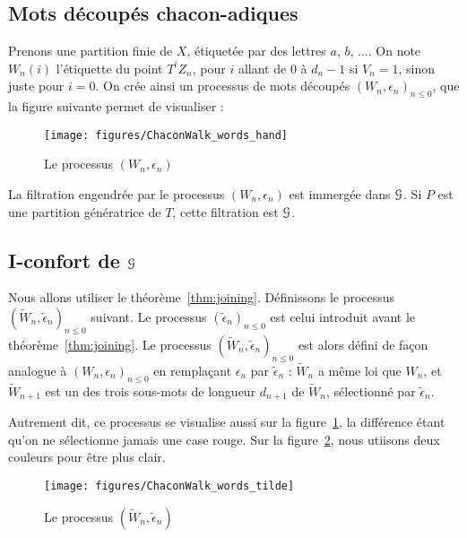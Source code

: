 \documentclass[12pt,a4paper]{article}
\begin{document}
\subsection{Mots découpés chacon-adiques}

Prenons une partition finie de $X$, étiquetée par des lettres $a$, $b$, $\ldots$.  
On note $W_n(i)$ l'étiquette du point $T^iZ_n$, pour $i$ allant de 
$0$ à $d_n-1$ si $V_n=1$, sinon juste pour $i=0$. 
On crée ainsi un processus de mots découpés ${(W_n, \epsilon_n)}_{n \leq 0}$, 
que la figure suivante permet de visualiser :

\begin{figure}[!h]
\centering
	\texttt{[image: figures/ChaconWalk\_words\_hand]}
\caption{Le processus $(W_n, \epsilon_n)$}\label{fig:Wn}
\end{figure}

La filtration engendrée par le processus $(W_n, \epsilon_n)$ est immergée dans 
$\EuScript{G}$. 
Si $P$ est une partition génératrice de $T$, cette filtration est 
 $\EuScript{G}$.  


\subsection{I-confort de $\EuScript{G}$}


Nous allons utiliser le théorème~\ref{thm:joining}. 
Définissons le processus  ${(\widetilde{W}_n, \widetilde{\epsilon}_n)}_{n \leq 0}$ suivant. 
Le processus ${(\widetilde{\epsilon}_n)}_{n \leq 0}$ est celui introduit 
avant le théorème~\ref{thm:joining}. 
Le processus  ${(\widetilde{W}_n, \widetilde{\epsilon}_n)}_{n \leq 0}$ 
est alors défini de façon analogue à ${(W_n, \epsilon_n)}_{n \leq 0}$ 
en remplaçant $\epsilon_n$ par $\widetilde{\epsilon}_n$ : 
$\widetilde{W}_n$ a même loi que $W_n$, et $\widetilde{W}_{n+1}$ est un 
des trois sous-mots de longueur $d_{n+1}$ de $\widetilde{W}_n$, sélectionné par 
$\widetilde{\epsilon}_n$. 

Autrement dit, ce processus se visualise aussi sur la figure~\ref{fig:Wn}, 
la différence étant qu'on ne sélectionne jamais une case rouge. 
Sur la figure~\ref{fig:tildeWn}, nous utiisons deux couleurs pour être plus clair.


\begin{figure}[!h]
\centering
	\texttt{[image: figures/ChaconWalk\_words\_tilde]}
\caption{Le processus $(\widetilde{W}_n, \widetilde{\epsilon}_n)$}\label{fig:tildeWn}
\end{figure}
\end{document}

